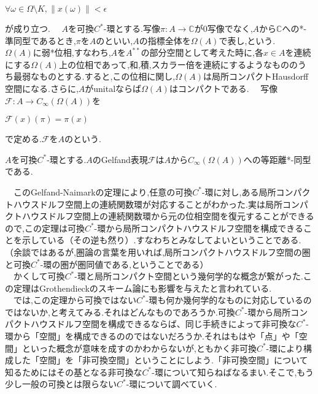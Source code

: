 \begin{center}
$\forall \omega \in \Omega\setminus K,\parallel x\left( \omega\right)\parallel<\epsilon$
\end{center}
が成り立つ.
　$A$を可換$C^*$-環とする.写像$\pi:A\rightarrow\mathbb{C}$が0写像でなく,$A$から$\mathbb{C}$への*-準同型であるとき,$\pi$を$A$のといい,$A$の指標全体を$\Omega\left(A\right)$で表し,という.
　$\Omega\left(A\right)$に弱*位相,すなわち,$A$を$A^{**}$の部分空間として考えた時に,各$x\in A$を連続にする$\Omega\left(A\right)$上の位相であって,和,積,スカラー倍を連続にするようなもののうち最弱なものとする.すると,この位相に関し,$\Omega\left(A\right)$は局所コンパクトHausdorff空間になる.さらに,$A$がunitalならば$\Omega\left(A\right)$はコンパクトである.
　写像$\mathscr{F}:A \rightarrow C_{\infty}\left(\Omega\left(A\right)\right)$を
\begin{center}
$\mathscr{F}\left(x\right)\left(\pi\right)=\pi\left(x\right)$
\end{center}
で定める.$\mathscr{F}$を$A$のという.
\begin{theo}
$A$を可換$C^*$-環とする.$A$の{\rm Gelfand}表現$\mathscr{F}$は$A$から$C_{\infty}\left(\Omega\left(A\right)\right)$への等距離*-同型である.
\end{theo}
　このGelfand-Naimarkの定理により,任意の可換$C^*$-環に対し,ある局所コンパクトハウスドルフ空間上の連続関数環が対応することがわかった.実は局所コンパクトハウスドルフ空間上の連続関数環から元の位相空間を復元することができるので,この定理は可換$C^*$-環から局所コンパクトハウスドルフ空間を構成できることを示している（その逆も然り）.すなわちとみなしてよいということである.（余談ではあるが,圏論の言葉を用いれば,局所コンパクトハウスドルフ空間の圏と可換$C^*$-環の圏が圏同値である,ということである）\\
　かくして可換$C^*$-環と局所コンパクト空間という幾何学的な概念が繋がった.この定理はGrothendieckのスキーム論にも影響を与えたと言われている.\\
　では,この定理から可換ではない$C^*$-環も何か幾何学的なものに対応しているのではないか,と考えてみる.それはどんなものであろうか.可換$C^*$-環から局所コンパクトハウスドルフ空間を構成できるならば、同じ手続きによって非可換な$C^*$-環から「空間」を構成できるののではないだろうか.それはもはや「点」や「空間」といった概念が意味を成すのかわからないが,ともかく非可換$C^*$-環により構成した「空間」を「非可換空間」ということにしよう.「非可換空間」について知るためにはその基となる非可換な$C^*$-環について知らねばなるまい.そこで,もう少し一般の可換とは限らない$C^*$-環について調べていく.
